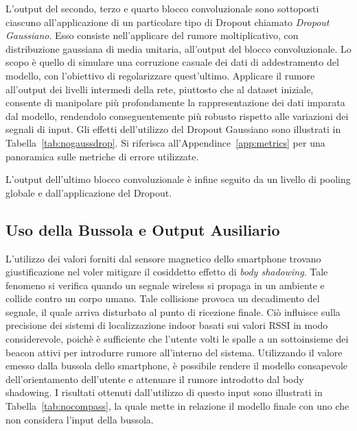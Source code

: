 L'output del secondo, terzo e quarto blocco convoluzionale sono sottoposti
ciascuno all'applicazione di un particolare tipo di Dropout\cite{dropout}
chiamato \emph{Dropout Gaussiano}. Esso consiste nell'applicare del rumore
moltiplicativo, con distribuzione gaussiana di media unitaria, all'output del
blocco convoluzionale. Lo scopo è quello di simulare una corruzione casuale dei
dati di addestramento del modello, con l'obiettivo di regolarizzare
quest'ultimo. Applicare il rumore all'output dei livelli intermedi della rete,
piuttosto che al dataset iniziale, consente di manipolare più profondamente la
rappresentazione dei dati imparata dal modello, rendendolo conseguentemente più
robusto rispetto alle variazioni dei segnali di
input\cite{noise-hidden-layers}. Gli effetti dell'utilizzo del Dropout
Gaussiano sono illustrati in Tabella~\ref{tab:nogaussdrop}. Si riferisca
all'Appendince~\ref{app:metrics} per una panoramica sulle metriche di errore
utilizzate.


L'output dell'ultimo blocco convoluzionale è infine seguito da un livello di
pooling globale e dall'applicazione del Dropout.
\subsection{Uso della Bussola e Output Ausiliario}
L'utilizzo dei valori forniti dal sensore magnetico dello smartphone trovano
giustificazione nel voler mitigare il cosiddetto effetto di \emph{body
  shadowing}.  Tale fenomeno si verifica quando un segnale wireless si propaga
in un ambiente e collide contro un corpo umano. Tale collisione provoca un
decadimento del segnale, il quale arriva disturbato al punto di ricezione
finale. Ciò influisce sulla precisione dei sistemi di localizzazione indoor
basati sui valori RSSI in modo considerevole, poichè è sufficiente che l'utente
volti le spalle a un sottoinsieme dei beacon attivi per introdurre rumore
all'interno del sistema. Utilizzando il valore emesso dalla bussola dello
smartphone, è possibile rendere il modello consapevole dell'orientamento
dell'utente e attenuare il rumore introdotto dal body shadowing. I risultati
ottenuti dall'utilizzo di questo input sono illustrati in
Tabella~\ref{tab:nocompass}, la quale mette in relazione il modello finale con
uno che non considera l'input della bussola.


